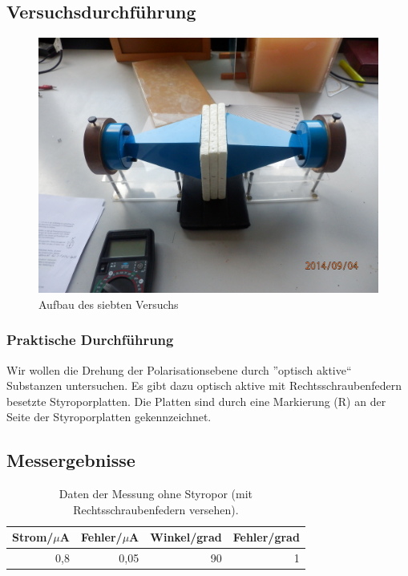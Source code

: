 \documentclass[12pt]{scrartcl}
\begin{document}
\subsection{Versuchsdurchführung}
\begin{figure}[H] 
  \centering
    \includegraphics[scale = 0.1]{a_7.JPG}
  	\caption[Aufbau des siebten Versuchs]{Aufbau des siebten Versuchs}
  \label{fig:a_3}
\end{figure}
\subsubsection{Praktische Durchführung}
Wir wollen die Drehung der Polarisationsebene durch ”optisch aktive“ Substanzen untersuchen. Es gibt dazu optisch aktive mit Rechtsschraubenfedern besetzte Styroporplatten. Die Platten sind durch eine Markierung (R) an der Seite der Styroporplatten gekennzeichnet.
\subsection{Messergebnisse}
\begin{table}[H]
\caption{Daten der Messung ohne Styropor (mit Rechtsschraubenfedern versehen).}
\centering
\begin{tabular}{|l|l|l|l|}
\hline
Strom/$\mu$A & Fehler/$\mu$A & Winkel/grad & Fehler/grad \\ \hline
\multicolumn{1}{|r|}{0,8} & \multicolumn{1}{r|}{0,05} & \multicolumn{1}{r|}{90} & \multicolumn{1}{r|}{1} \\ \hline
\end{tabular}
\label{tab:a_7_o}
\end{table}
\end{document}
